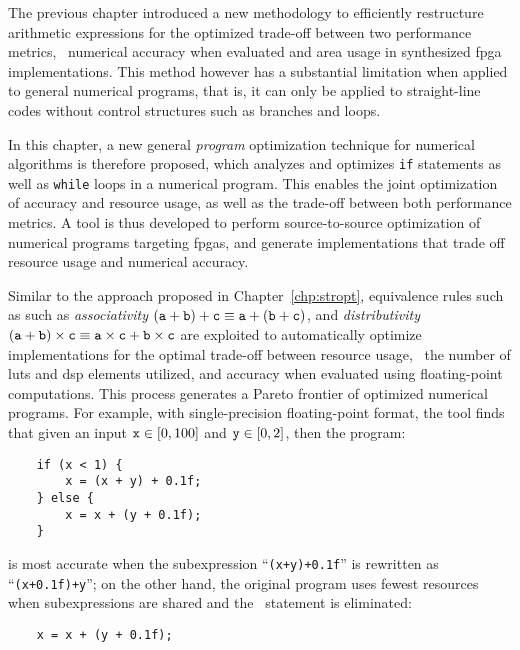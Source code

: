 The previous chapter introduced a new methodology to efficiently restructure
arithmetic expressions for the optimized trade-off between two performance
metrics, \ie~numerical accuracy when evaluated and area usage in synthesized
\gls{fpga} implementations.  This method however has a substantial limitation
when applied to general numerical programs, that is, it can only be applied to
straight-line codes without control structures such as branches and loops.

In this chapter, a new general \emph{program} optimization technique for
numerical algorithms is therefore proposed, which analyzes and optimizes
\texttt{if} statements as well as \texttt{while} loops in a numerical program.
This enables the joint optimization of accuracy and resource usage, as well
as the trade-off between both performance metrics.  A tool is thus developed
to perform source-to-source optimization of numerical programs targeting
\glspl{fpga}, and generate implementations that trade off resource usage and
numerical accuracy.


Similar to the approach proposed in Chapter~\ref{chp:stropt}, equivalence
rules such as such as \emph{associativity} $(\texttt{a} + \texttt{b}) + \texttt{c} \equiv
\texttt{a} + (\texttt{b} + \texttt{c})$, and \emph{distributivity} $(\texttt{a} + \texttt{b}) \times
\texttt{c} \equiv \texttt{a} \times \texttt{c} + \texttt{b} \times \texttt{c}$ are exploited to
automatically optimize implementations for the optimal trade-off between
resource usage, \ie~the number of \glspl{lut} and \gls{dsp} elements utilized,
and accuracy when evaluated using floating-point computations.  This process
generates a Pareto frontier of optimized numerical programs.  For example, with
single-precision floating-point format, the tool finds that given an input
$\texttt{x} \in [0, 100]$ and $\texttt{y} \in [0, 2]$, then the program:
\begin{minipage}{\linewidth}
\begin{lstlisting}
    if (x < 1) {
        x = (x + y) + 0.1f;
    } else {
        x = x + (y + 0.1f);
    }
\end{lstlisting}
\end{minipage}
is most accurate when the subexpression ``\verb|(x+y)+0.1f|'' is rewritten
as ``\verb|(x+0.1f)+y|''; on the other hand, the original program uses
fewest resources when subexpressions are shared and the \iflit~statement is
eliminated:
\begin{lstlisting}
    x = x + (y + 0.1f);
\end{lstlisting}

